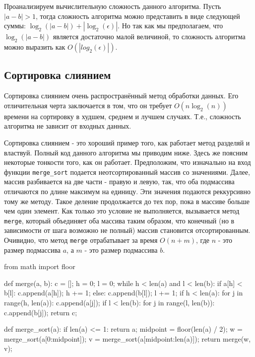 Проанализируем вычислительную сложность данного алгоритма. 
Пусть $|a-b|>1$, тогда сложность алгоритма можно представить в виде 
следующей суммы: $\log_2(|a-b|) + |\log_2(\epsilon)|$. Но так как 
мы предполагаем, что $\log_2(|a-b|)$ является достаточно 
малой величиной, то сложность алгоритма можно выразить как 
$O(|log_2(\epsilon)|)$.


\subsection{Сортировка слиянием}

Сортировка слиянием очень распространённый метод обработки данных. 
Его отличительная черта заключается в том, что он требует $O(n\log_2(n))$
времени на сортировку в худшем, среднем и лучшем случаях. Т.е., сложность 
алгоритма не зависит от входных данных.

Сортировка слиянием - это хороший пример того, как работает метод разделяй и
властвуй. Полный код данного алгоритма мы приводим ниже. Здесь же поясним
некоторые тонкости того, как он работает. Предположим, что изначально на вход функции 
\texttt{merge\_sort} подается неотсортированный массив со значениями.
Далее, массив разбивается на две части - правую и левую, так, что оба 
подмассива отличаются по длине максимум на единицу. Эти значения подаются 
реккурсивно тому же методу. Такое деление продолжается до тех пор, пока
в массиве больше чем один элемент. Как только это условие не выполняется,
вызывается метод \texttt{merge}, который объединяет оба массива таким
образом, что конечный (но в зависимости от шага возможно не полный) массив
становится отсортированным. Очивидно, что метод \texttt{merge} отрабатывает
за время $O(n + m)$, где $n$ - это размер подмассива $a$, а $m$ - это 
размер подмассива $b$.

\begin{python}

from math import floor

def merge(a, b):
	c = [];
	h = 0;
	l = 0;
	while h < len(a) and l < len(b):
		if a[h] < b[l]:
			c.append(a[h]);
			h += 1;
		else:
			c.append(b[l]);
			l += 1;
	if h < len(a):
		for j in range(h, len(a)):
			c.append(a[j]);
	if l < len(b):
		for j in range(l, len(b)):
			c.append(b[j]);
	return c;

def merge_sort(a):
	if len(a) <= 1:
		return a;
	midpoint = floor(len(a) / 2);
	w = merge_sort(a[0:midpoint]);
	v = merge_sort(a[midpoint:len(a)]);
	return merge(w, v);
\end{python}

